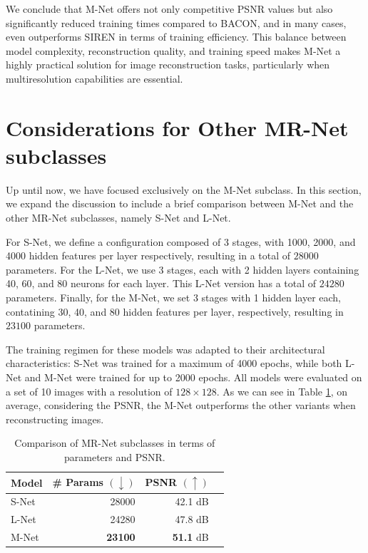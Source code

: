 We conclude that M-Net offers not only competitive PSNR values but also significantly reduced training times compared to BACON, and in many cases, even outperforms SIREN in terms of training efficiency. This balance between model complexity, reconstruction quality, and training speed makes M-Net a highly practical solution for image reconstruction tasks, particularly when multiresolution capabilities are essential.

\section{Considerations for Other MR-Net subclasses}\label{sec:considerations}

Up until now, we have focused exclusively on the M-Net subclass. In this section, we expand the discussion to include a brief comparison between M-Net and the other MR-Net subclasses, namely S-Net and L-Net.

For S-Net, we define a configuration composed of 3 stages, with 1000, 2000, and 4000 hidden features per layer respectively, resulting in a total of $28000$ parameters. For the L-Net, we use 3 stages, each with 2 hidden layers containing 40, 60, and 80 neurons for each layer. This L-Net version has a total of $24280$ parameters. Finally, for the M-Net, we set 3 stages with 1 hidden layer each, contatining 30, 40, and 80 hidden features per layer, respectively, resulting in $23100$ parameters. 

The training regimen for these models was adapted to their architectural characteristics: S-Net was trained for a maximum of 4000 epochs, while both L-Net and M-Net were trained for up to 2000 epochs. All models were evaluated on a set of 10 images with a resolution of $128 \times 128$. As we can see in Table \ref{t:comp-variants}, on average, considering the PSNR, the M-Net outperforms the other variants when reconstructing images.

\begin{table}[!h]
  \centering
  \small
  \begin{tabular}{|l|r|r|r|}
  \hline
  Model & \# Params $(\downarrow)$ & PSNR $(\uparrow)$  \\
  \hline
  S-Net & 28000 & 42.1 dB  \\
  L-Net & 24280 & 47.8 dB \\
  M-Net & {\bf 23100} & {\bf 51.1} dB   \\
  \hline
  \end{tabular}
  \caption{Comparison of MR-Net subclasses in terms of parameters and PSNR.}
  \label{t:comp-variants}
\end{table}

